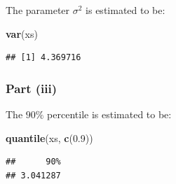 \documentclass[
  12pt,
]{paper}
\newenvironment{Shaded}{\begin{snugshade}}{\end{snugshade}}
\newcommand{\FloatTok}[1]{\textcolor[rgb]{0.00,0.00,0.81}{#1}}
\newcommand{\FunctionTok}[1]{\textcolor[rgb]{0.13,0.29,0.53}{\textbf{#1}}}
\newcommand{\NormalTok}[1]{#1}
\begin{document}
The parameter \(\sigma^2\) is estimated to be:

\begin{Shaded}
\begin{Highlighting}[]
\FunctionTok{var}\NormalTok{(xs)}
\end{Highlighting}
\end{Shaded}

\begin{verbatim}
## [1] 4.369716
\end{verbatim}

\hypertarget{part-iii}{%
\subsubsection{Part (iii)}\label{part-iii}}

The \(90\%\) percentile is estimated to be:

\begin{Shaded}
\begin{Highlighting}[]
\FunctionTok{quantile}\NormalTok{(xs, }\FunctionTok{c}\NormalTok{(}\FloatTok{0.9}\NormalTok{))}
\end{Highlighting}
\end{Shaded}

\begin{verbatim}
##      90% 
## 3.041287
\end{verbatim}
\end{document}
